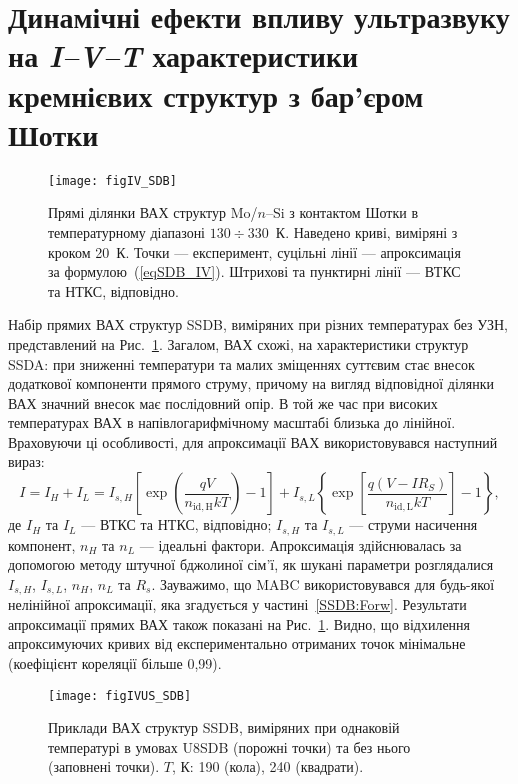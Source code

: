 \documentclass[a4paper,14pt,oneside,openany]{memoir}
\begin{document}
\section{Динамічні ефекти впливу ультразвуку на \emph{I--V--T} характеристики кремнієвих структур з бар'єром Шотки\label{SSDB:Forw}}

\begin{figure}
\center
\texttt{[image: figIV\_SDB]}
\caption{\label{figIV_SDB}
Прямі  ділянки ВАХ структур Mo/$n$--Si з контактом Шотки в температурному діапазоні $130\div330$~К.
Наведено криві, виміряні з кроком 20~К.
Точки --- експеримент,
суцільні лінії --- апроксимація за формулою~(\ref{eqSDB_IV}).
Штрихові та пунктирні лінії --- ВТКС та НТКС, відповідно.
}%
\end{figure}


Набір прямих ВАХ структур  SSDB, виміряних при різних температурах без УЗН, представлений на Рис.~\ref{figIV_SDB}.
Загалом, ВАХ схожі, на характеристики структур SSDA:
при зниженні температури та малих зміщеннях суттєвим стає внесок додаткової компоненти прямого струму, причому
на вигляд відповідної ділянки ВАХ значний внесок має послідовний опір.
В той же час при високих температурах ВАХ в напівлогарифмічному масштабі близька до лінійної.
Враховуючи ці особливості, для апроксимації ВАХ використовувався наступний вираз:
\begin{equation}
\label{eqSDB_IV}
  I=I_H+I_L=I_{s,H}\left[\exp\left(\frac{qV}{n_\mathrm{id,H}kT}\right)-1\right]+
 I_{s,L}\left\{\exp\left[\frac{q(V-IR_S)}{n_\mathrm{id,L}kT}\right]-1\right\},
\end{equation}
де
$I_H$ та $I_L$ --- ВТКС та НТКС, відповідно;
$I_{s,H}$ та $I_{s,L}$ --- струми насичення компонент,
$n_{H}$ та $n_{L}$ --- ідеальні фактори.
Апроксимація здійснювалась за допомогою методу штучної бджолиної сім'ї,
як шукані параметри розглядалися $I_{s,H}$, $I_{s,L}$, $n_{H}$, $n_{L}$ та $R_s$.
Зауважимо, що MABC використовувався для будь-якої нелінійної апроксимації, яка згадується у частині~\ref{SSDB:Forw}.
Результати апроксимації прямих ВАХ також показані на Рис.~\ref{figIV_SDB}.
Видно, що відхилення апроксимуючих кривих від експериментально отриманих точок мінімальне
(коефіцієнт кореляції більше 0,99).

\begin{figure}
\center
\texttt{[image: figIVUS\_SDB]}
\caption{\label{figIVUS_SDB}
Приклади ВАХ структур SSDB, виміряних при однаковій температурі в умовах U8SDB (порожні точки) та без нього (заповнені точки).
$T$, К: 190 (кола), 240 (квадрати).
}%
\end{figure}
\end{document}
